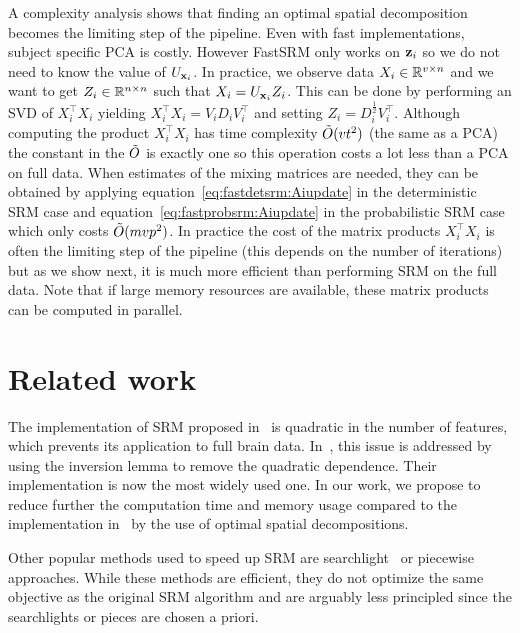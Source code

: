 \documentclass{article}
\begin{document}
A complexity analysis shows that finding an optimal spatial decomposition becomes the limiting
step of the pipeline.
%
Even with fast implementations, subject specific PCA
is costly.
%
However FastSRM only works on $\mathbf{z}_i$ so we do not need to know the value of
$U_{\mathbf{x}_i}$.
%
In practice, we observe data $X_i \in \mathbb{R}^{v \times n}$ and we want to get $Z_i
\in \mathbb{R}^{n \times n}$ such that $X_i = U_{\mathbf{x}_i} Z_i$.
%
This can be done by performing an
SVD of $X_i^{\top} X_i$ yielding $X_i^{\top}X_i= V_i D_i V_i^{\top}$ and setting
$Z_i = D_i^{\frac12} V_i^{\top}$.
%
Although computing the product $X_i^{\top} X_i$ has time complexity
$\tilde{O}(vt^2)$ (the same as a PCA) the constant in the $\tilde{O}$ is exactly one so
this operation costs a lot less than a PCA
on full data.
%
When estimates of the mixing matrices are needed, they can be obtained by
applying equation~\eqref{eq:fastdetsrm:Aiupdate} in the deterministic SRM case and
equation~\eqref{eq:fastprobsrm:Aiupdate} in the probabilistic SRM case which only costs
$\tilde{O}(mvp^2)$.
%
In practice the cost of the matrix products $X_i^{\top} X_i$ is often the
limiting step of the pipeline (this depends on the number of iterations) but as
we show next, it is much more efficient than performing SRM on
the full data.
%
Note that if large  memory resources are available, these matrix products can be
computed in parallel.
%

\section{Related work}
The implementation of SRM proposed in~\cite{chen2015reduced} is quadratic in the
number of features, which prevents its application to full brain data.
In~\cite{anderson2016enabling}, this issue is addressed by using the
inversion lemma to remove the quadratic dependence. Their implementation is now the most widely used one.
In our work, we propose to reduce further the computation time and memory usage
compared to the implementation in~\cite{anderson2016enabling} by the use of
optimal spatial decompositions.

Other popular methods used to speed up SRM are searchlight~\cite{zhang2016searchlight} or piecewise~\cite{bazeille2021empirical}
approaches. While these methods are efficient, they do not optimize the same
objective as the original SRM algorithm and are arguably less principled since the
searchlights or pieces are chosen a priori.
\end{document}
